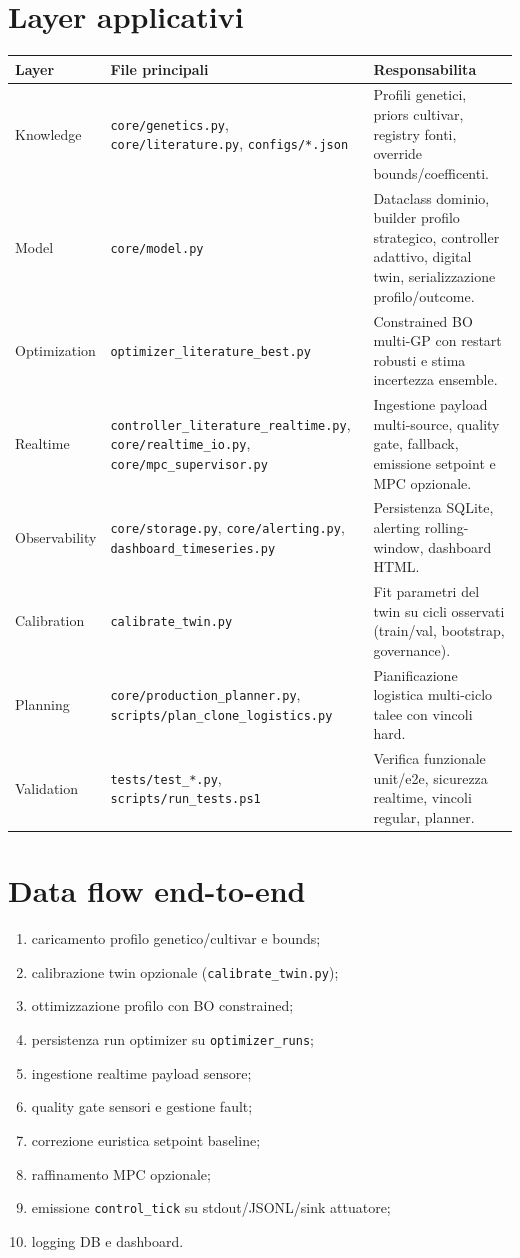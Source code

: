 ﻿\documentclass[11pt,a4paper]{report}
\begin{document}
\section{Layer applicativi}
\begin{longtable}{@{}p{2.8cm}p{5.0cm}p{7.2cm}@{}}
\toprule
Layer & File principali & Responsabilita \\ \midrule
Knowledge & \texttt{core/genetics.py}, \texttt{core/literature.py}, \texttt{configs/*.json} & Profili genetici, priors cultivar, registry fonti, override bounds/coefficenti. \\
Model & \texttt{core/model.py} & Dataclass dominio, builder profilo strategico, controller adattivo, digital twin, serializzazione profilo/outcome. \\
Optimization & \texttt{optimizer\_literature\_best.py} & Constrained BO multi-GP con restart robusti e stima incertezza ensemble. \\
Realtime & \texttt{controller\_literature\_realtime.py}, \texttt{core/realtime\_io.py}, \texttt{core/mpc\_supervisor.py} & Ingestione payload multi-source, quality gate, fallback, emissione setpoint e MPC opzionale. \\
Observability & \texttt{core/storage.py}, \texttt{core/alerting.py}, \texttt{dashboard\_timeseries.py} & Persistenza SQLite, alerting rolling-window, dashboard HTML. \\
Calibration & \texttt{calibrate\_twin.py} & Fit parametri del twin su cicli osservati (train/val, bootstrap, governance). \\
Planning & \texttt{core/production\_planner.py}, \texttt{scripts/plan\_clone\_logistics.py} & Pianificazione logistica multi-ciclo talee con vincoli hard. \\
Validation & \texttt{tests/test\_*.py}, \texttt{scripts/run\_tests.ps1} & Verifica funzionale unit/e2e, sicurezza realtime, vincoli regular, planner. \\
\bottomrule
\end{longtable}

\section{Data flow end-to-end}
\begin{enumerate}
  \item caricamento profilo genetico/cultivar e bounds;
  \item calibrazione twin opzionale (\texttt{calibrate\_twin.py});
  \item ottimizzazione profilo con BO constrained;
  \item persistenza run optimizer su \texttt{optimizer\_runs};
  \item ingestione realtime payload sensore;
  \item quality gate sensori e gestione fault;
  \item correzione euristica setpoint baseline;
  \item raffinamento MPC opzionale;
  \item emissione \texttt{control\_tick} su stdout/JSONL/sink attuatore;
  \item logging DB e dashboard.
\end{enumerate}
\end{document}
